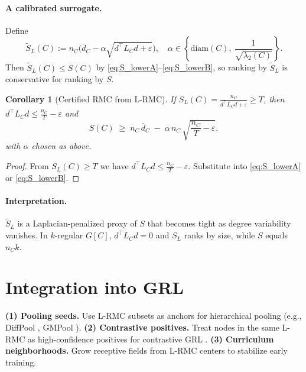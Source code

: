 \documentclass{article} %
\newtheorem{corollary}{Corollary}
\theoremstyle{remark}
\newcommand{\diam}{\mathrm{diam}}
\begin{document}
\paragraph{A calibrated surrogate.}
Define
\[
\widetilde S_L(C) := n_C\Big(\bar d_C - \alpha\sqrt{d^\top L_C d + \varepsilon}\Big),
\quad
\alpha \in \left\{\diam(C),\ \frac{1}{\sqrt{\lambda_2(C)}}\right\}.
\]
Then \(\widetilde S_L(C) \le S(C)\) by \eqref{eq:S_lowerA}--\eqref{eq:S_lowerB}, so ranking by \(\widetilde S_L\) is conservative for ranking by \(S\).

\begin{corollary}[Certified RMC from L-RMC]
\label{cor:stopping_rule}
If \(S_L(C) = \frac{n_C}{d^\top L_C d + \varepsilon} \ge T\), then \(d^\top L_C d \le \frac{n_C}{T} - \varepsilon\) and
\begin{equation}
\label{eq:S_bound_from_SL}
S(C) \;\ge\; n_C\,\bar d_C \;-\; \alpha\,n_C\,\sqrt{\frac{n_C}{T} - \varepsilon},
\end{equation}
with \(\alpha\) chosen as above.
\end{corollary}

\begin{proof}
From \(S_L(C)\ge T\) we have \(d^\top L_C d \le \frac{n_C}{T}-\varepsilon\).
Substitute into \eqref{eq:S_lowerA} or \eqref{eq:S_lowerB}.
\end{proof}

\paragraph{Interpretation.}
\(\widetilde S_L\) is a Laplacian-penalized proxy of \(S\) that becomes tight as degree variability vanishes. In \(k\)-regular \(G[C]\), \(d^\top L_C d=0\) and \(S_L\) ranks by size, while \(S\) equals \(n_C k\).


\section{Integration into GRL}
\textbf{(1) Pooling seeds.} Use L-RMC subsets as anchors for hierarchical pooling (e.g., DiffPool \citep{ying2018hierarchical}, GMPool \citep{gao2019graph}).
\textbf{(2) Contrastive positives.} Treat nodes in the same L-RMC as high-confidence positives for contrastive GRL \citep{velickovic2019deep,you2020graph}.
\textbf{(3) Curriculum neighborhoods.} Grow receptive fields from L-RMC centers to stabilize early training.
\end{document}
